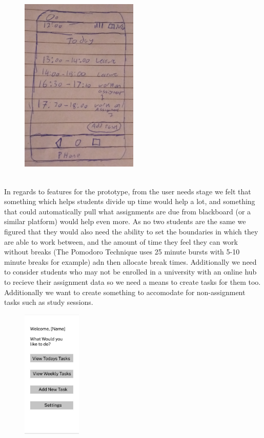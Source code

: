 \documentclass{article}
\begin{document}
	\begin{figure}[h!]
		\centering
		\includegraphics[width=0.5\textwidth]{1.jpg}
	\end{figure}\\
	In regards to features for the prototype, from the user needs stage we felt that something which helps students divide up time would help a lot, and something that could automatically pull what assignments are due from blackboard (or a similar platform) would help even more. As no two students are the same we figured that they would also need the ability to set the boundaries in which they are able to work between, and the amount of time they feel they can work without breaks (The Pomodoro Technique uses 25 minute bursts with 5-10 minute breaks for example) adn then allocate break times. Additionally we need to consider students who may not be enrolled in a university with an online hub to recieve their assignment data so we need a means to create tasks for them too. Additionally we want to create something to accomodate for non-assignment tasks such as study sessions.\\
		\begin{figure}[h!]
			\centering
			\includegraphics[width=0.25\textwidth]{menu.jpg}
		\end{figure}\\
\end{document}
